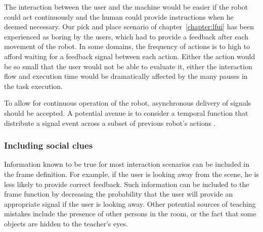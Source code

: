The interaction between the user and the machine would be easier if the robot could act continuously and the human could provide instructions when he deemed necessary. Our pick and place scenario of chapter~\ref{chapter:lfui} has been experienced as boring by the users, which had to provide a feedback after each movement of the robot. In some domains, the frequency of actions is to high to afford waiting for a feedback signal between each action. Either the action would be so small that the user would not be able to evaluate it, either the interaction flow and execution time would be dramatically affected by the many pauses in the task execution.

To allow for continuous operation of the robot, asynchronous delivery of signals should be accepted. A potential avenue is to consider a temporal function that distribute a signal event across a subset of previous robot's actions \cite{hockley1984analysis,knox2009interactively}. 


\subsubsection*{Including social clues}

Information known to be true for most interaction scenarios can be included in the frame definition. For example, if the user is looking away from the scene, he is less likely to provide correct feedback. Such information can be included to the frame function by decreasing the probability that the user will provide an appropriate signal if the user is looking away. Other potential sources of teaching mistakes include the presence of other persons in the room, or the fact that some objects are hidden to the teacher's eyes.



